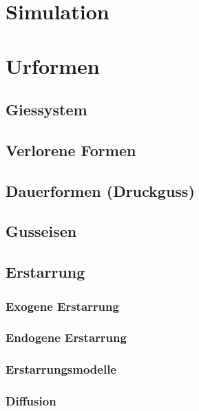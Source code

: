\documentclass[12pt]{cheatsheet}
\begin{document}
\section*{Simulation}
    
    \vfill \null \columnbreak


\section*{Urformen}
    \subsection*{Giessystem}
        
    \subsection*{Verlorene Formen}
    
    \subsection*{Dauerformen (Druckguss)}
    
    \subsection*{Gusseisen}
    
    \subsection*{Erstarrung}
    
    \subsubsection*{Exogene Erstarrung}
    
    \subsubsection*{Endogene Erstarrung}
    
    \subsubsection*{Erstarrungsmodelle}
    
    \subsubsection*{Diffusion}
    
\end{document}
